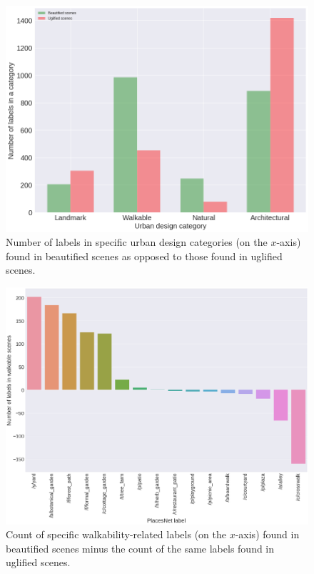 \begin{figure}[h]
    \centering
    \includegraphics[width=\columnwidth]{taxonomyCount.png}
    \caption{Number of labels in specific urban design categories (on the $x$-axis) found in beautified scenes as opposed to those found in uglified scenes.}
    \label{fig:taxonomyCount}
\end{figure}


\begin{figure}[h]
    \centering
    \includegraphics[width=\columnwidth]{walkable_taxonomy.png}
    \caption{Count of specific walkability-related labels  (on the $x$-axis) found in beautified scenes minus the count of the same labels found in uglified scenes.}
    \label{fig:WalkableTnomy}
\end{figure}


